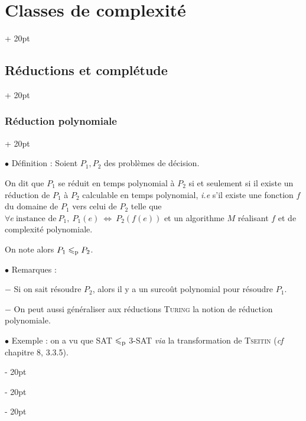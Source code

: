 \documentclass[a4paper, 12pt, twoside]{article}
\newcommand{\ssi}{\ \Leftrightarrow \ }
\renewcommand{\le}{\leqslant}
\newcommand{\ind}[1][20pt]{\advance\leftskip + #1}
\newcommand{\deind}[1][20pt]{\advance\leftskip - #1}
\newenvironment{indt}[2][20pt]{#2 \par \ind[#1]}{\par \deind} %
\begin{document}
\begin{indt}{\section{Classes de complexité}}
        \vspace{12pt}
        
        \begin{indt}{\subsection{Réductions et complétude}}
            \begin{indt}{\subsubsection{Réduction polynomiale}}
                \label{2.3.1}

                $\bullet$ Définition : Soient $P_1, P_2$ des problèmes de décision.

                On dit que $P_1$ se réduit en temps polynomial à $P_2$ si et seulement si il existe un réduction de $P_1$ à $P_2$ calculable en temps polynomial, \textit{i.e} s'il existe une fonction $f$ du domaine de $P_1$ vers celui de $P_2$ telle que $\forall e\ \text{instance de}\ P_1,\ P_1(e) \ssi P_2(f(e))$ et un algorithme $M$ réalisant $f$ et de complexité polynomiale.

                On note alors $P_1 \le_{\rm p} P_2$.

                \vspace{12pt}
                
                $\bullet$ Remarques :

                $-$ Si on sait résoudre $P_2$, alors il y a un surcoût polynomial pour résoudre $P_1$.

                $-$ On peut aussi généraliser aux réductions \textsc{Turing} la notion de réduction polynomiale.

                \vspace{12pt}
                
                $\bullet$ Exemple : on a vu que SAT $\le_{\rm p}$ 3-SAT \textit{via} la transformation de \textsc{Tseitin} (\textit{cf} chapitre 8, 3.3.5).


\end{indt}
\end{indt}
\end{indt}
\end{document}
